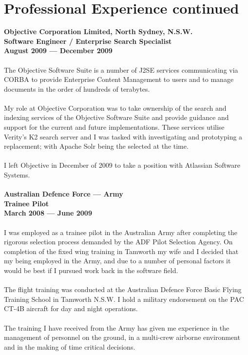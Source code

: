 \documentclass[a4paper]{article}
\begin{document}
\newpage
\ryanHeader

\section*{Professional Experience continued}
\textbf{Objective Corporation Limited, North Sydney, N.S.W.\\Software Engineer / Enterprise Search Specialist\\August 2009 --- December 2009}\\\\
The Objective Software Suite is a number of J2SE services communicating via CORBA to provide Enterprise Content Management to users and to manage documents in the order of hundreds of terabytes.\\\\
My role at Objective Corporation was to take ownership of the search and indexing services of the Objective Software Suite and provide guidance and support for the current and future implementations. These services utilise Verity's K2 search server and I was tasked with investigating and prototyping a replacement; with Apache Solr being the selected at the time.\\\\
I left Objective in December of 2009 to take a position with Atlassian Software Systems.\\\\
\textbf{Australian Defence Force --- Army\\Trainee Pilot\\March 2008 --- June 2009}\\\\
I was employed as a trainee pilot in the Australian Army after completing the rigorous selection process demanded by the ADF Pilot Selection Agency. On completion of the fixed wing training in Tamworth my wife and I decided that my being employed in the Army, and due to a number of personal factors it would be best if I pursued work back in the software field.\\\\
The flight training was conducted at the Australian Defence Force Basic Flying Training School in Tamworth N.S.W. I hold a military endorsement on the PAC CT-4B aircraft for day and night operations.\\\\
The training I have received from the Army has given me experience in the management of personnel on the ground, in a multi-crew airborne environment and in the making of time critical decisions.\\\\
\end{document}
